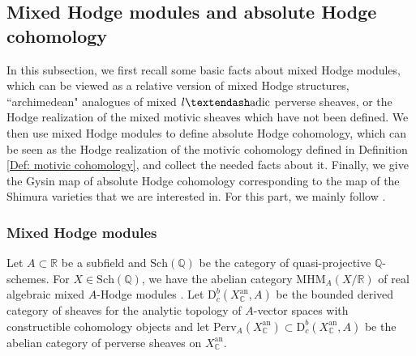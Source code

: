 \documentclass[11pt, a4paper]{amsart}
\theoremstyle{plain}
\theoremstyle{definition}
\numberwithin{equation}{section}
\def\CC{\mathbb{C}}
\def\QQ{\mathbb{Q}}
\def\RR{\mathbb{R}}
\begin{document}
 \subsection{Mixed Hodge modules and absolute Hodge cohomology}
 \label{SS:MHM and abs Hodge coh}
 
 In this subsection, we first recall some basic facts about mixed Hodge modules, which can be viewed as a relative version of mixed Hodge structures, ``archimedean" analogues of mixed $l{\textendash}\mathrm{adic}$ perverse sheaves, or the Hodge realization of the mixed motivic sheaves which have not been defined. We then use mixed Hodge modules to define absolute Hodge cohomology, which can be seen as the Hodge realization of the motivic cohomology defined in Definition \ref{Def: motivic cohomology}, and collect the needed facts about it. Finally, we give the Gysin map of absolute Hodge cohomology corresponding to the map of the Shimura varieties that we are interested in.  For this part, we mainly follow \cite[\S2.2]{LemmaI15}. 

 \subsubsection{Mixed Hodge modules}
Let $A \subset \RR$ be a subfield and $\mathrm{Sch}(\QQ)$ be the category of quasi-projective $\QQ$-schemes. For $X \in \mathrm{Sch}(\QQ)$, we have the abelian category $\mathrm{MHM}_{A}(X/\RR)$ of real algebraic mixed $A$-Hodge modules \cite[Definition A.2.4]{HW98}.  Let $\mathrm{D}_{c}^{b}(X^{\mathrm{an}}_{\CC}, A)$ be the bounded derived category of sheaves for the analytic topology of $A$-vector spaces with constructible cohomology objects and let $\mathrm{Perv}_{A}(X^{\mathrm{an}}_{\CC}) \subset \mathrm{D}_{c}^{b}(X^{\mathrm{an}}_{\CC}, A)$ be the abelian category of perverse sheaves on $X^{\mathrm{an}}_{\CC}$.   
\end{document}
